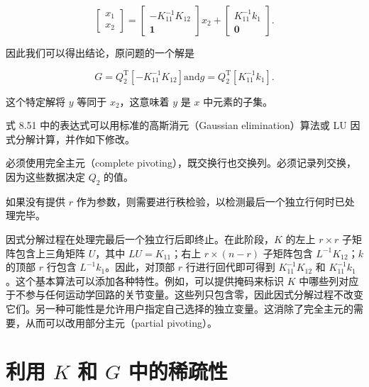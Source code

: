 \documentclass[10pt,a4paper]{book}
\theoremstyle{thmstyle} %
\theoremstyle{defstyle} %
\theoremstyle{prostyle} %
\begin{document}
$$
\left[ \begin{array}{l} { x _ { 1 } } \\{ x _ { 2 } } \end{array} \right] = \left[ \begin{array}{l} { - K _ { 11 } ^{- 1} K _ { 12 } } \\{ \mathbf { 1 } } \end{array} \right] x _ { 2 } + \left[ \begin{array}{l} { K _ { 11 } ^{- 1} k _ { 1 } } \\{ \mathbf { 0 } } \end{array} \right] .
$$



因此我们可以得出结论，原问题的一个解是



$$
G = Q _ { 2 } ^{\mathrm { T} } \left[ - K _ { 11 } ^{- 1} K _ { 12 } \right]  \mathrm { a n d }  g = Q _ { 2 } ^{\mathrm { T} } \left[ K _ { 11 } ^{- 1} k _ { 1 } \right] .
$$



这个特定解将 $y$ 等同于 $x_2$，这意味着 $y$ 是 $x$ 中元素的子集。



式 8.51 中的表达式可以用标准的高斯消元（Gaussian elimination）算法或 LU 因式分解计算，并作如下修改。



必须使用完全主元（complete pivoting），既交换行也交换列。必须记录列交换，因为这些数据决定 $Q_2$ 的值。



如果没有提供 $r$ 作为参数，则需要进行秩检验，以检测最后一个独立行何时已处理完毕。



因式分解过程在处理完最后一个独立行后即终止。在此阶段，$K$ 的左上 $r \times r$ 子矩阵包含上三角矩阵 $U$，其中 $LU = K_{11}$；右上 $r \times (n - r)$ 子矩阵包含 $L^{-1}K_{12}$；$k$ 的顶部 $r$ 行包含 $L^{-1}k_1$。因此，对顶部 $r$ 行进行回代即可得到 $K_{11}^{-1}K_{12}$ 和 $K_{11}^{-1}k_1$。这个基本算法可以添加各种特性。例如，可以提供掩码来标识 $K$ 中哪些列对应于不参与任何运动学回路的关节变量。这些列只包含零，因此因式分解过程不改变它们。另一种可能性是允许用户指定自己选择的独立变量。这消除了完全主元的需要，从而可以改用部分主元（partial pivoting）。



\section{利用 $K$ 和 $G$ 中的稀疏性}
\end{document}
